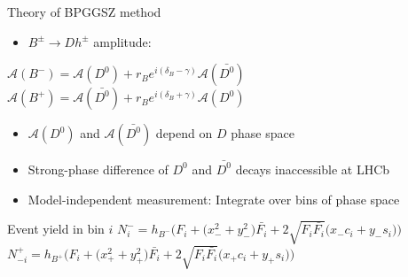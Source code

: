 \documentclass{beamer}
\begin{document}
\begin{frame}{Theory of BPGGSZ method}
  \begin{itemize}
    \item{$B^\pm\to Dh^\pm$ amplitude:}
  \end{itemize}
  \begin{center}
    $\mathcal{A}(B^-) = \mathcal{A}(D^0) + r_Be^{i(\delta_B - \gamma)}\mathcal{A}(\bar{D^0})$ \\
    $\mathcal{A}(B^+) = \mathcal{A}(\bar{D^0}) + r_Be^{i(\delta_B + \gamma)}\mathcal{A}(D^0)$ \\
  \end{center}
  \begin{itemize}
    \item{$\mathcal{A}(D^0)$ and $\mathcal{A}(\bar{D^0})$ depend on $D$ phase space}
    \item{Strong-phase difference of $D^0$ and $\bar{D^0}$ decays inaccessible at LHCb}
    \item{Model-independent measurement: Integrate over bins of phase space}
  \end{itemize}
  \begin{block}{Event yield in bin $i$}
    $N^-_i = h_{B^-}\Big(F_i + \big(x_-^2 + y_-^2\big)\bar{F_i} + 2\sqrt{F_i\bar{F_i}}\big(x_-c_i + y_-s_i\big)\Big)$
    $N^+_{-i} = h_{B^+}\Big(F_i + \big(x_+^2 + y_+^2\big)\bar{F_i} + 2\sqrt{F_i\bar{F_i}}\big(x_+c_i + y_+s_i\big)\Big)$
  \end{block}
\end{frame}
\end{document}
